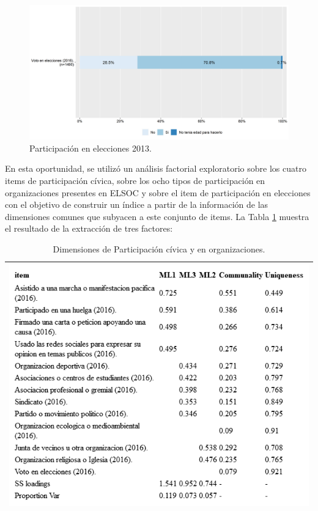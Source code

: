 \documentclass[
  12pt,
]{book}
\begin{document}
\begin{figure}[H]

{\centering \includegraphics[width=1\linewidth,height=1\textheight]{output/graphs/participacion-electoral} 

}

\caption{Participación en elecciones 2013.}\label{fig:participacion-electoral}
\end{figure}

En esta oportunidad, se utilizó un análisis factorial exploratorio sobre los cuatro items de participación cívica, sobre los ocho tipos de participación en organizaciones presentes en ELSOC y sobre el item de participación en elecciones con el objetivo de construir un índice a partir de la información de las dimensiones comunes que subyacen a este conjunto de items. La Tabla \ref{tab:participacion-fa} muestra el resultado de la extracción de tres factores:

\begin{longtable}[]{@{}l@{}}
\caption{\label{tab:participacion-fa}Dimensiones de Participación cívica y en organizaciones.}\tabularnewline
\toprule
\endhead
\includegraphics[width=8.33333in,height=\textheight]{output/tables/participacion_fa.png}\tabularnewline
\bottomrule
\end{longtable}
\end{document}
